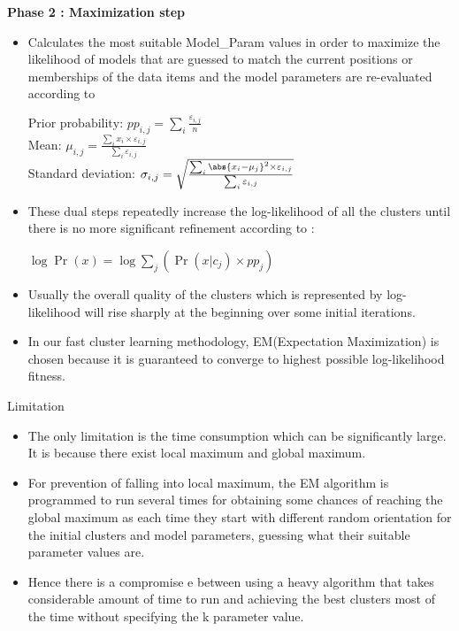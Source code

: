 \documentclass{beamer}
\providecommand{\pr}[1]{\ensuremath{\Pr\left(#1\right)}}
\providecommand{\pr}[1]{\ensuremath{\Pr\left(#1\right)}}
\begin{document}
\begin{frame}{}
    \textbf{Phase 2 : Maximization step}
    \begin{itemize}
        \item Calculates the most suitable 
Model\_Param values in order to maximize the likelihood of 
models that are guessed to match the current positions or 
memberships of the data items and the model parameters are re-evaluated according to
\begin{block}
 $\text{Prior probability: } pp_{i,j} = \sum_i \frac{\varepsilon_{i,j}}{n}$\\
Mean: $\mu_{i,j} = \frac{\sum_i x_i \times \varepsilon_{i,j}}{\sum_i \varepsilon_{i,j}}$\\
Standard deviation: $\sigma_{i,j} = \sqrt{\frac{\sum_i \abs{x_i - \mu_j}^2 \times \varepsilon_{i,j}}{\sum_i \varepsilon_{i,j}}}$
\end{block}
    \end{itemize}
\end{frame}

\begin{frame}{}
    \begin{itemize}
        \item These dual steps repeatedly increase the log-likelihood of 
all the clusters until there is no more significant refinement 
according to :
\begin{block}
    $\log\pr{x} = \log \sum_j (\pr{x|c_j} \times pp_j)$
\end{block}
\item Usually the overall quality of the clusters which is 
represented by log-likelihood will rise sharply at the 
beginning over some initial iterations.
\item In our fast cluster learning methodology, EM(Expectation Maximization) 
is chosen because it is guaranteed to converge to highest 
possible log-likelihood fitness.
    \end{itemize}
\end{frame}

\begin{frame}{Limitation}
\begin{itemize}
    \item The only limitation is the 
time consumption which can be significantly large. It is 
because there exist local maximum and global maximum.
\item  For prevention of falling into 
local maximum, the EM algorithm is programmed to run 
several times for obtaining some chances of reaching the 
global maximum as each time they start with different 
random orientation for the initial clusters and model 
parameters, guessing what their suitable parameter values are.
\item Hence there is a compromise e between using a heavy algorithm that 
takes considerable amount of time to run and achieving the 
best clusters most of the time without specifying the k
parameter value.
\end{itemize}
\end{frame}
\end{document}
